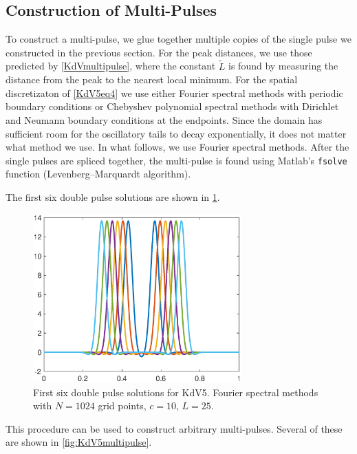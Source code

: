 \documentclass[thesis.tex]{subfiles}
\begin{document}
\subsection{Construction of Multi-Pulses}

To construct a multi-pulse, we glue together multiple copies of the single pulse we constructed in the previous section. For the peak distances, we use those predicted by \cref{KdVmultipulse}, where the constant $\tilde{L}$ is found by measuring the distance from the peak to the nearest local minimum. For the spatial discretizaton of \eqref{KdV5eq4} we use either Fourier spectral methods with periodic boundary conditions or Chebyshev polynomial spectral methods with Dirichlet and Neumann boundary conditions at the endpoints. Since the domain has sufficient room for the oscillatory tails to decay exponentially, it does not matter what method we use. In what follows, we use Fourier spectral methods. After the single pulses are spliced together, the multi-pulse is found using Matlab's \texttt{fsolve} function (Levenberg–Marquardt algorithm).

The first six double pulse solutions are shown in \cref{fig:KdV5doublepulse}.

\begin{figure}[H]
\begin{center}
\includegraphics[width=8cm]{images/kdv5numerics/double10.eps}
\caption{First six double pulse solutions for KdV5. Fourier spectral methods with $N = 1024$ grid points, $c = 10$, $L = 25$.}
\label{fig:KdV5doublepulse}
\end{center}
\end{figure}

This procedure can be used to construct arbitrary multi-pulses. Several of these are shown in \cref{fig:KdV5multipulse}.
\end{document}
